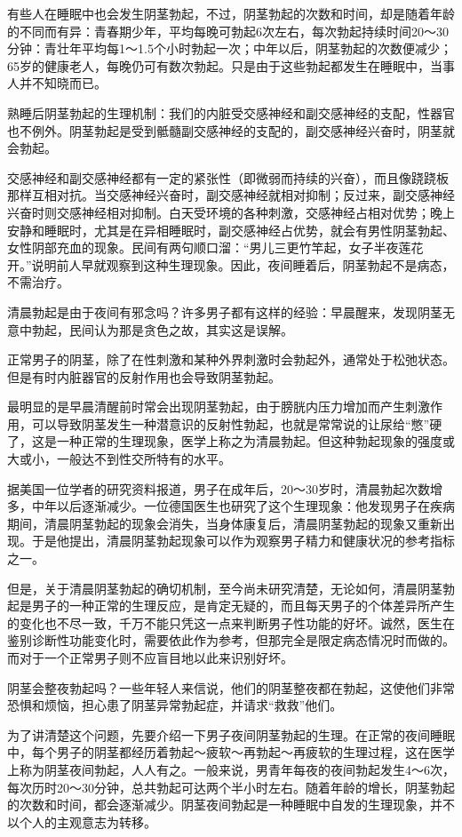 有些人在睡眠中也会发生阴茎勃起，不过，阴茎勃起的次数和时间，却是随着年龄的不同而有异：青春期少年，平均每晚可勃起6次左右，每次勃起持续时间20～30分钟：青壮年平均每1～1.5个小时勃起一次；中年以后，阴茎勃起的次数便减少；65岁的健康老人，每晚仍可有数次勃起。只是由于这些勃起都发生在睡眠中，当事人并不知晓而已。

熟睡后阴茎勃起的生理机制：我们的内脏受交感神经和副交感神经的支配，性器官也不例外。阴茎勃起是受到骶髓副交感神经的支配的，副交感神经兴奋时，阴茎就会勃起。

交感神经和副交感神经都有一定的紧张性（即微弱而持续的兴奋），而且像跷跷板那样互相对抗。当交感神经兴奋时，副交感神经就相对抑制；反过来，副交感神经兴奋时则交感神经相对抑制。白天受环境的各种刺激，交感神经占相对优势；晚上安静和睡眠时，尤其是在异相睡眠时，副交感神经占优势，就会有男性阴茎勃起、女性阴部充血的现象。民间有两句顺口溜：“男儿三更竹竿起，女子半夜莲花开。”说明前人早就观察到这种生理现象。因此，夜间睡着后，阴茎勃起不是病态，不需治疗。

清晨勃起是由于夜间有邪念吗？许多男子都有这样的经验：早晨醒来，发现阴茎无意中勃起，民间认为那是贪色之故，其实这是误解。

正常男子的阴茎，除了在性刺激和某种外界刺激时会勃起外，通常处于松弛状态。但是有时内脏器官的反射作用也会导致阴茎勃起。

最明显的是早晨清醒前时常会出现阴茎勃起，由于膀胱内压力增加而产生刺激作用，可以导致阴茎发生一种潜意识的反射性勃起，也就是常常说的让尿给“憋”硬了，这是一种正常的生理现象，医学上称之为清晨勃起。但这种勃起现象的强度或大或小，一般达不到性交所特有的水平。

据美国一位学者的研究资料报道，男子在成年后，20～30岁时，清晨勃起次数增多，中年以后逐渐减少。一位德国医生也研究了这个生理现象：他发现男子在疾病期间，清晨阴茎勃起的现象会消失，当身体康复后，清晨阴茎勃起的现象又重新出现。于是他提出，清晨阴茎勃起现象可以作为观察男子精力和健康状况的参考指标之一。

但是，关于清晨阴茎勃起的确切机制，至今尚未研究清楚，无论如何，清晨阴茎勃起是男子的一种正常的生理反应，是肯定无疑的，而且每天男子的个体差异所产生的变化也不尽一致，千万不能只凭这一点来判断男子性功能的好坏。诚然，医生在鉴别诊断性功能变化时，需要依此作为参考，但那完全是限定病态情况时而做的。而对于一个正常男子则不应盲目地以此来识别好坏。

阴茎会整夜勃起吗？一些年轻人来信说，他们的阴茎整夜都在勃起，这使他们非常恐惧和烦恼，担心患了阴茎异常勃起症，并请求“救救”他们。

为了讲清楚这个问题，先要介绍一下男子夜间阴茎勃起的生理。在正常的夜间睡眠中，每个男子的阴茎都经历着勃起～疲软～再勃起～再疲软的生理过程，这在医学上称为阴茎夜间勃起，人人有之。一般来说，男青年每夜的夜间勃起发生4～6次，每次历时20～30分钟，总共勃起可达两个半小时左右。随着年龄的增长，阴茎勃起的次数和时间，都会逐渐减少。阴茎夜间勃起是一种睡眠中自发的生理现象，并不以个人的主观意志为转移。

